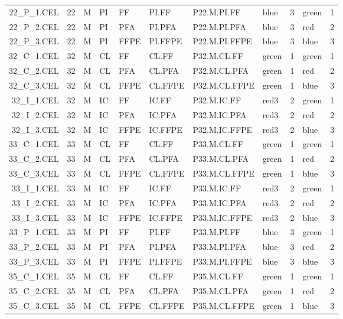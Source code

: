 \documentclass[a4paper]{article}\usepackage[]{graphicx}\usepackage[]{color}
\begin{document}
{\begin{longtable}{rlllllllrlr}
  22\_P\_1.CEL & 22 & M & PI & FF & PI.FF & P22.M.PI.FF & blue &   3 & green &   1 \\ 
  22\_P\_2.CEL & 22 & M & PI & PFA & PI.PFA & P22.M.PI.PFA & blue &   3 & red &   2 \\ 
  22\_P\_3.CEL & 22 & M & PI & FFPE & PI.FFPE & P22.M.PI.FFPE & blue &   3 & blue &   3 \\ 
  32\_C\_1.CEL & 32 & M & CL & FF & CL.FF & P32.M.CL.FF & green &   1 & green &   1 \\ 
  32\_C\_2.CEL & 32 & M & CL & PFA & CL.PFA & P32.M.CL.PFA & green &   1 & red &   2 \\ 
  32\_C\_3.CEL & 32 & M & CL & FFPE & CL.FFPE & P32.M.CL.FFPE & green &   1 & blue &   3 \\ 
  32\_I\_1.CEL & 32 & M & IC & FF & IC.FF & P32.M.IC.FF & red3 &   2 & green &   1 \\ 
  32\_I\_2.CEL & 32 & M & IC & PFA & IC.PFA & P32.M.IC.PFA & red3 &   2 & red &   2 \\ 
  32\_I\_3.CEL & 32 & M & IC & FFPE & IC.FFPE & P32.M.IC.FFPE & red3 &   2 & blue &   3 \\ 
  33\_C\_1.CEL & 33 & M & CL & FF & CL.FF & P33.M.CL.FF & green &   1 & green &   1 \\ 
  33\_C\_2.CEL & 33 & M & CL & PFA & CL.PFA & P33.M.CL.PFA & green &   1 & red &   2 \\ 
  33\_C\_3.CEL & 33 & M & CL & FFPE & CL.FFPE & P33.M.CL.FFPE & green &   1 & blue &   3 \\ 
  33\_I\_1.CEL & 33 & M & IC & FF & IC.FF & P33.M.IC.FF & red3 &   2 & green &   1 \\ 
  33\_I\_2.CEL & 33 & M & IC & PFA & IC.PFA & P33.M.IC.PFA & red3 &   2 & red &   2 \\ 
  33\_I\_3.CEL & 33 & M & IC & FFPE & IC.FFPE & P33.M.IC.FFPE & red3 &   2 & blue &   3 \\ 
  33\_P\_1.CEL & 33 & M & PI & FF & PI.FF & P33.M.PI.FF & blue &   3 & green &   1 \\ 
  33\_P\_2.CEL & 33 & M & PI & PFA & PI.PFA & P33.M.PI.PFA & blue &   3 & red &   2 \\ 
  33\_P\_3.CEL & 33 & M & PI & FFPE & PI.FFPE & P33.M.PI.FFPE & blue &   3 & blue &   3 \\ 
  35\_C\_1.CEL & 35 & M & CL & FF & CL.FF & P35.M.CL.FF & green &   1 & green &   1 \\ 
  35\_C\_2.CEL & 35 & M & CL & PFA & CL.PFA & P35.M.CL.PFA & green &   1 & red &   2 \\ 
  35\_C\_3.CEL & 35 & M & CL & FFPE & CL.FFPE & P35.M.CL.FFPE & green &   1 & blue &   3 \\ 

\end{longtable}}
\end{document}
